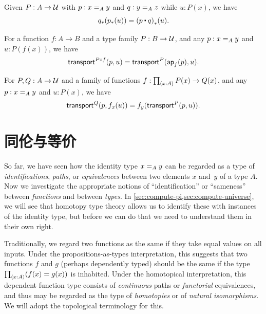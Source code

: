 \begin{lem}\label{thm:transport-concat}
  Given $P:A\to\type$ with $p:\id[A]xy$ and $q:\id[A]yz$ while $u:P(x)$, we have
  \[ \trans{q}{\trans{p}{u}} = \trans{(p\ct q)}{u}. \]
\end{lem}

\begin{lem}\label{thm:transport-compose}
  For a function $f:A\to B$ and a type family $P:B\to\type$, and any $p:\id[A]xy$ and $u:P(f(x))$, we have
  \[ \transfib{P\circ f}{p}{u} = \transfib{P}{\apfunc f(p)}{u}. \]
\end{lem}

\begin{lem}\label{thm:ap-transport}
  For $P,Q:A\to \type$ and a family of functions $f:\prd{x:A} P(x)\to Q(x)$, and any $p:\id[A]xy$ and $u:P(x)$, we have
  \[ \transfib{Q}{p}{f_x(u)} = f_y(\transfib{P}{p}{u}). \]
\end{lem}

%

\section{同伦与等价}
\label{sec:basics-equivalences}

%

So far, we have seen how the identity type $\id[A]xy$ can be regarded as a type of \emph{identifications}, \emph{paths}, or \emph{equivalences} between two elements $x$ and~$y$ of a type $A$.
Now we investigate the appropriate notions of ``identification'' or ``sameness'' between \emph{functions} and between \emph{types}.
In \cref{sec:compute-pi,sec:compute-universe}, we will see that homotopy type theory allows us to identify these with instances of the identity type, but before we can do that we need to understand them in their own right.

Traditionally, we regard two functions as the same if they take equal values on all inputs.
Under the propositions-as-types interpretation, this suggests that two functions $f$ and $g$ (perhaps dependently typed) should be the same if the type $\prd{x:A} (f(x)=g(x))$ is inhabited.
Under the homotopical interpretation, this dependent function type consists of \emph{continuous} paths or \emph{functorial} equivalences, and thus may be regarded as the type of \emph{homotopies} or of \emph{natural isomorphisms}.
We will adopt the topological terminology for this.

